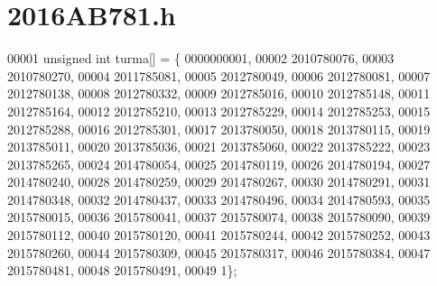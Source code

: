 \section{2016\+A\+B781.h}
\label{2016AB781_8h_source}

\begin{DoxyCode}
00001 \textcolor{keywordtype}{unsigned} \textcolor{keywordtype}{int} turma[] = \{ 0000000001,
00002 2010780076,
00003 2010780270,
00004 2011785081,
00005 2012780049,
00006 2012780081,
00007 2012780138,
00008 2012780332,
00009 2012785016,
00010 2012785148,
00011 2012785164,
00012 2012785210,
00013 2012785229,
00014 2012785253,
00015 2012785288,
00016 2012785301,
00017 2013780050,
00018 2013780115,
00019 2013785011,
00020 2013785036,
00021 2013785060,
00022 2013785222,
00023 2013785265,
00024 2014780054,
00025 2014780119,
00026 2014780194,
00027 2014780240,
00028 2014780259,
00029 2014780267,
00030 2014780291,
00031 2014780348,
00032 2014780437,
00033 2014780496,
00034 2014780593,
00035 2015780015,
00036 2015780041,
00037 2015780074,
00038 2015780090,
00039 2015780112,
00040 2015780120,
00041 2015780244,
00042 2015780252,
00043 2015780260,
00044 2015780309,
00045 2015780317,
00046 2015780384,
00047 2015780481,
00048 2015780491,
00049 1\};
\end{DoxyCode}
